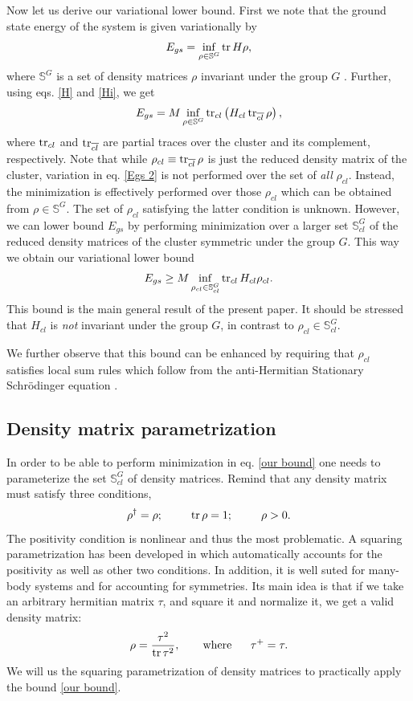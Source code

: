 \documentclass[a4paper]{jpconf}
\renewcommand\[{\begin{equation}}
\renewcommand\]{\end{equation}}
\begin{document}
Now let us derive our variational lower bound. First we note that the ground state energy of the system is given variationally by 
\[
E_{gs} = 
\inf\limits_{ \rho \in {\mathbb S}^G} \mathop{\rm{tr}} H \rho,
\]
where  ${\mathbb S}^G$ is a set of density matrices $\rho$  invariant under the group $G$ \cite{Shpagina}. Further, using eqs. \eqref{H} and \eqref{Hi}, we get 
\[\label{Egs 2}
E_{gs} =
M \inf\limits_{ \rho \in {\mathbb S}^G} \tr_{cl} \left( H_{cl} \tr_{\overline{cl}}\rho\right),
\]
where $\mathop{\mathrm{tr}}\nolimits_{cl}$ and $\mathop{\mathrm{tr}}\nolimits_{\overline{cl}}$ are partial traces over the cluster and its complement, respectively. Note that while $\rho_{cl}\equiv\mathop{\mathrm{tr}}\nolimits_{\overline{cl}}\rho$ is just the reduced density matrix of the cluster, variation in eq. \eqref{Egs 2} is not performed over the set of {\it all} $\rho_{cl}$. Instead, the minimization is effectively performed over those $\rho_{cl}$ which can be obtained from $\rho \in {\mathbb S}^G$. The set of $\rho_{cl}$ satisfying the latter condition is unknown. However, we can lower bound $E_{gs}$ by performing minimization over a larger set ${\mathbb S}_{cl}^G$ of the reduced density matrices of the cluster symmetric under the group $G$. This way we obtain our variational lower bound
\[\label{our bound}
E_{gs} \geq 
M \inf\limits_{ \rho_{cl} \in {\mathbb S}_{cl}^G} \tr_{cl}  H_{cl} \rho_{cl}.
\]
This bound is the main general result of the present paper. It should be stressed that $H_{cl}$ is {\it not} invariant under  the group $G$, in contrast to $\rho_{cl} \in {\mathbb S}_{cl}^G$.


We further observe that this bound can be enhanced by requiring that $\rho_{cl}$ satisfies local sum rules which follow from the anti-Hermitian Stationary Schr\"odinger equation \cite{Shpagina}. 

\subsection{Density matrix parametrization}
In order to be able to perform minimization in eq. \eqref{our bound} one needs to parameterize the set ${\mathbb S}_{cl}^G$ of density matrices. Remind that any density matrix must satisfy three conditions,
\[{\rho ^ \dagger } = \rho ;\qquad \mathop{\rm{tr}}\rho  = 1;\qquad  \rho  > 0. \label{conditions on rho}\]
The positivity condition is nonlinear and thus the most problematic. A squaring parametrization has been developed in \cite{SqParam} which automatically accounts for the positivity as well as other two conditions. In addition, it is well suted for many-body systems and for accounting for symmetries. Its main idea is that if we take an arbitrary hermitian matrix $\tau$, and square it and normalize it, we get a valid density matrix:
\[\rho  = \frac{{{\tau ^2}}}{{\mathop{\rm{tr}}{\tau ^2}}},~~~~~~{\rm where}~~~~~ {\tau ^ + } = \tau. \label{tau}\]
We will us the squaring parametrization of density matrices to practically apply the bound \eqref{our bound}.
\end{document}
